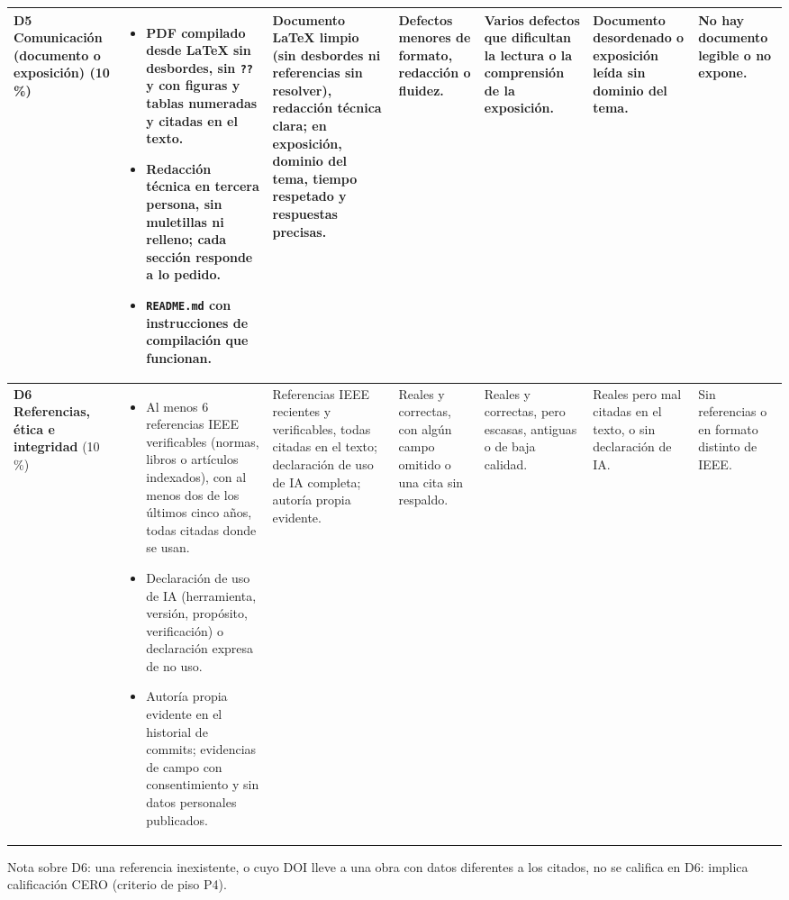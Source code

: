 \documentclass[11pt]{article}
\begin{document}
\begin{landscape}
{\begin{longtable}{|L{2.4cm}|L{5.6cm}|L{3.1cm}|L{2.8cm}|L{2.8cm}|L{2.7cm}|L{2.1cm}|}
	\textbf{D5 Comunicación (documento o exposición)} (10\,\%) & \begin{itemize}[leftmargin=9pt,itemsep=0pt,topsep=0pt,parsep=0pt,partopsep=0pt,after=\vspace{-\baselineskip}]\item PDF compilado desde \LaTeX{} sin desbordes, sin \texttt{??} y con figuras y tablas numeradas y citadas en el texto.\item Redacción técnica en tercera persona, sin muletillas ni relleno; cada sección responde a lo pedido.\item \texttt{README.md} con instrucciones de compilación que funcionan.\end{itemize} & Documento \LaTeX{} limpio (sin desbordes ni referencias sin resolver), redacción técnica clara; en exposición, dominio del tema, tiempo respetado y respuestas precisas. & Defectos menores de formato, redacción o fluidez. & Varios defectos que dificultan la lectura o la comprensión de la exposición. & Documento desordenado o exposición leída sin dominio del tema. & No hay documento legible o no expone.\\
	\hline
	\textbf{D6 Referencias, ética e integridad} (10\,\%) & \begin{itemize}[leftmargin=9pt,itemsep=0pt,topsep=0pt,parsep=0pt,partopsep=0pt,after=\vspace{-\baselineskip}]\item Al menos 6 referencias IEEE verificables (normas, libros o artículos indexados), con al menos dos de los últimos cinco años, todas citadas donde se usan.\item Declaración de uso de IA (herramienta, versión, propósito, verificación) o declaración expresa de no uso.\item Autoría propia evidente en el historial de commits; evidencias de campo con consentimiento y sin datos personales publicados.\end{itemize} & Referencias IEEE recientes y verificables, todas citadas en el texto; declaración de uso de IA completa; autoría propia evidente. & Reales y correctas, con algún campo omitido o una cita sin respaldo. & Reales y correctas, pero escasas, antiguas o de baja calidad. & Reales pero mal citadas en el texto, o sin declaración de IA. & Sin referencias o en formato distinto de IEEE.\\
	\hline
\end{longtable}
}
{\footnotesize Nota sobre D6: una referencia inexistente, o cuyo DOI lleve a una obra con datos diferentes a los citados, no se califica en D6: implica calificación CERO (criterio de piso P4).}
\end{landscape}
\end{document}
